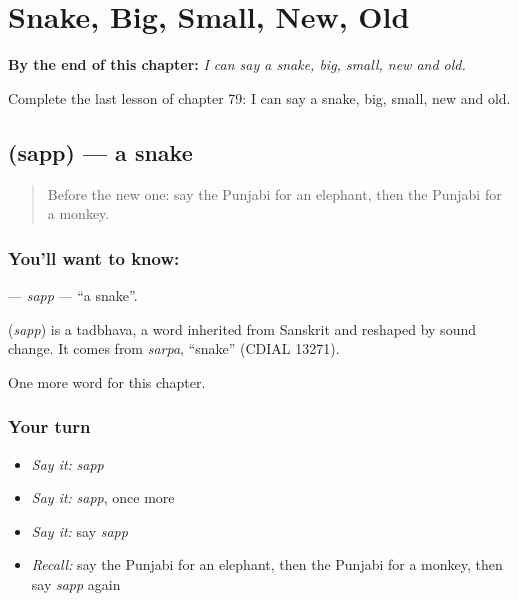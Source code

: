 
\chapter{Snake, Big, Small, New, Old}
\label{ch:pa-snake-big-small-new-old}

\begin{chapteropening}
\textbf{By the end of this chapter:} \emph{I can say a snake, big, small, new and old.}

Complete the last lesson of chapter 79: I can say a snake, big, small, new and old.
\end{chapteropening}

\section[\texorpdfstring{\pa{ਸੱਪ} (sapp)}{ਸੱਪ (sapp)}]{ (sapp) — a snake}

\label{lesson:PA-C79-sapp}



\begin{quote}
Before the new one: say the Punjabi for an elephant, then the Punjabi for a monkey.
\end{quote}

\subsection*{You'll want to know: }
\textbf{} — \emph{sapp} — \textquotedblleft{}a snake\textquotedblright{}.

\begin{cousinweb}
\textbf{} (\emph{sapp}) is a tadbhava, a word inherited from Sanskrit and reshaped by sound change. It comes from \emph{sarpa}, \textquotedblleft{}snake\textquotedblright{} (CDIAL 13271).
\end{cousinweb}

\begin{grammarlens}[title={What you've built}]
One more word for this chapter.
\end{grammarlens}

\subsection*{Your turn}
\begin{itemize}
\raggedright
  \item \emph{Say it:} \emph{sapp}
  \item \emph{Say it:} \emph{sapp}, once more
  \item \emph{Say it:} say \emph{sapp}
  \item \emph{Recall:} say the Punjabi for an elephant, then the Punjabi for a monkey, then say \emph{sapp} again
\end{itemize}

